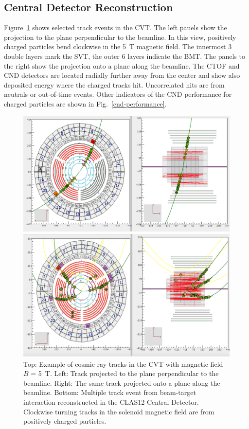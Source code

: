 \documentclass[final,3p,twocolumn]{elsarticle}
\begin{document}
\subsection{Central Detector Reconstruction}

Figure~\ref{cvt-tracks} shows selected track events in the CVT. The left panels show the projection to the plane
perpendicular to the beamline. In this view, positively charged particles bend clockwise in the 5~T magnetic field.
The innermost 3 double layers mark the SVT, the outer 6 layers indicate the BMT. The panels to the right show the
projection onto a plane along the beamline. The CTOF and CND detectors are located radially further away from
the center and show also deposited energy where the charged tracks hit. Uncorrelated hits are from neutrals or
out-of-time events. Other indicators of the CND performance for charged particles are shown in
Fig.~\ref{cnd-performance}.  

\begin{figure}[th!]
\centerline{\includegraphics[width=1.0\columnwidth]{cvt-cosmic-w-solenoid.png}}
\centerline{\includegraphics[width=1.0\columnwidth]{cvt-3-tracks.png}}
\caption{Top: Example of cosmic ray tracks in the CVT with magnetic field $B$ = 5~T. Left: Track projected to
the plane perpendicular to the beamline. Right: The same track projected onto a plane along the beamline. Bottom:
Multiple track event from beam-target interaction reconstructed in the CLAS12 Central Detector. 
Clockwise turning tracks in the solenoid magnetic field are from positively charged particles.}
\label{cvt-tracks}
\end{figure}
\end{document}
